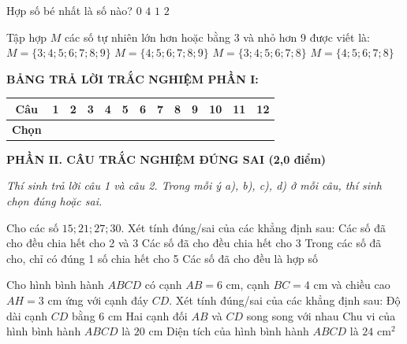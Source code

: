 \documentclass[12pt,a4paper]{article}
\begin{document}
\begin{ex}
Hợp số bé nhất là số nào?
\choice
{$0$}
{\True $4$}
{$1$}
{$2$}
\end{ex}

\begin{ex}
Tập hợp $M$ các số tự nhiên lớn hơn hoặc bằng 3 và nhỏ hơn 9 được viết là:
\choice
{$M = \{3; 4; 5; 6; 7; 8; 9\}$}
{$M = \{4; 5; 6; 7; 8; 9\}$}
{\True $M = \{3; 4; 5; 6; 7; 8\}$}
{$M = \{4; 5; 6; 7; 8\}$}
\end{ex}


\vspace{1mm}
\noindent\textbf{BẢNG TRẢ LỜI TRẮC NGHIỆM PHẦN I:}
\begin{center}
\begin{tabular}{|c|c|c|c|c|c|c|c|c|c|c|c|c|}
\hline
\textbf{Câu} & \textbf{1} & \textbf{2} & \textbf{3} & \textbf{4} & \textbf{5} & \textbf{6} & \textbf{7} & \textbf{8} & \textbf{9} & \textbf{10} & \textbf{11} & \textbf{12} \\
\hline
\textbf{Chọn} & \rule{0pt}{0.65cm} & & & & & & & & & & & \\
\hline
\end{tabular}
\end{center}
\vspace{2mm}

\setcounter{ex}{0}
\noindent\textbf{\large PHẦN II. CÂU TRẮC NGHIỆM ĐÚNG SAI (2,0 điểm)}

\textit{Thí sinh trả lời câu 1 và câu 2. Trong mỗi ý a), b), c), d) ở mỗi câu, thí sinh chọn đúng hoặc sai.}

\vspace{1mm}
\begin{ex}
Cho các số $15; 21; 27; 30$. Xét tính đúng/sai của các khẳng định sau:
\choiceTF
{Các số đã cho đều chia hết cho 2 và 3}
{\True Các số đã cho đều chia hết cho 3}
{Trong các số đã cho, chỉ có đúng 1 số chia hết cho 5}
{\True Các số đã cho đều là hợp số}
\end{ex}

\begin{ex}
Cho hình bình hành $ABCD$ có cạnh $AB = 6\text{ cm}$, cạnh $BC = 4\text{ cm}$ và chiều cao $AH = 3\text{ cm}$ ứng với cạnh đáy $CD$. Xét tính đúng/sai của các khẳng định sau:
\choiceTF
{\True Độ dài cạnh $CD$ bằng $6\text{ cm}$}
{\True Hai cạnh đối $AB$ và $CD$ song song với nhau}
{\True Chu vi của hình bình hành $ABCD$ là $20\text{ cm}$}
{Diện tích của hình bình hành $ABCD$ là $24\text{ cm}^2$}
\end{ex}
\end{document}
